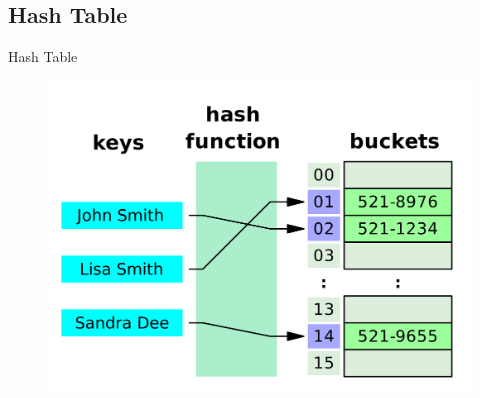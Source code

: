 \documentclass{beamer}
\begin{document}
\subsection{Hash Table}
\begin{frame}{Hash Table}
    \begin{figure}
        \centering
        \includegraphics[scale=0.1]{imgs/2.3/hash-table/hash_table.png}
    \end{figure}
\end{frame}
\end{document}
